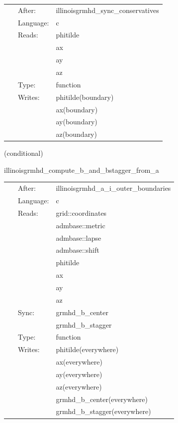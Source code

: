 \documentclass{article}
\begin{document}
 \begin{tabular*}{160mm}{cll} 
~ & After:  & illinoisgrmhd\_sync\_conservatives \\ 
~ & Language:  & c \\ 
~ & Reads:  & phitilde \\ 
~& ~ &ax\\ 
~& ~ &ay\\ 
~& ~ &az\\ 
~ & Type:  & function \\ 
~ & Writes:  & phitilde(boundary) \\ 
~& ~ &ax(boundary)\\ 
~& ~ &ay(boundary)\\ 
~& ~ &az(boundary)\\ 
\end{tabular*} 


\vspace{5mm}

   (conditional) 

\hspace{5mm} illinoisgrmhd\_compute\_b\_and\_bstagger\_from\_a 

\hspace{5mm}{\it compute b and b\_stagger from a sync: grmhd\_primitives\_bi,grmhd\_primitives\_bi\_stagger } 


\hspace{5mm}

 \begin{tabular*}{160mm}{cll} 
~ & After:  & illinoisgrmhd\_a\_i\_outer\_boundaries \\ 
~ & Language:  & c \\ 
~ & Reads:  & grid::coordinates \\ 
~& ~ &admbase::metric\\ 
~& ~ &admbase::lapse\\ 
~& ~ &admbase::shift\\ 
~& ~ &phitilde\\ 
~& ~ &ax\\ 
~& ~ &ay\\ 
~& ~ &az\\ 
~ & Sync:  & grmhd\_b\_center \\ 
~& ~ &grmhd\_b\_stagger\\ 
~ & Type:  & function \\ 
~ & Writes:  & phitilde(everywhere) \\ 
~& ~ &ax(everywhere)\\ 
~& ~ &ay(everywhere)\\ 
~& ~ &az(everywhere)\\ 
~& ~ &grmhd\_b\_center(everywhere)\\ 
~& ~ &grmhd\_b\_stagger(everywhere)\\ 
\end{tabular*} 
\end{document}

